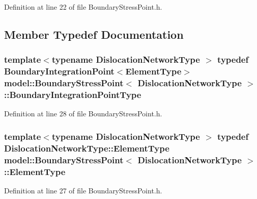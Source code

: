Definition at line 22 of file Boundary\+Stress\+Point.\+h.



\subsection{Member Typedef Documentation}
\hypertarget{structmodel_1_1_boundary_stress_point_a8e4470be4cf3e1bf6b903a300a9d5734}{}
\subsubsection[{Boundary\+Integration\+Point\+Type}]{\setlength{\rightskip}{0pt plus 5cm}template$<$typename Dislocation\+Network\+Type $>$ typedef {\bf Boundary\+Integration\+Point}$<${\bf Element\+Type}$>$ {\bf model\+::\+Boundary\+Stress\+Point}$<$ Dislocation\+Network\+Type $>$\+::{\bf Boundary\+Integration\+Point\+Type}}\label{structmodel_1_1_boundary_stress_point_a8e4470be4cf3e1bf6b903a300a9d5734}


Definition at line 28 of file Boundary\+Stress\+Point.\+h.

\hypertarget{structmodel_1_1_boundary_stress_point_abbe62ae453e93d99f80b043f4de9bf04}{}
\subsubsection[{Element\+Type}]{\setlength{\rightskip}{0pt plus 5cm}template$<$typename Dislocation\+Network\+Type $>$ typedef Dislocation\+Network\+Type\+::\+Element\+Type {\bf model\+::\+Boundary\+Stress\+Point}$<$ Dislocation\+Network\+Type $>$\+::{\bf Element\+Type}}\label{structmodel_1_1_boundary_stress_point_abbe62ae453e93d99f80b043f4de9bf04}


Definition at line 27 of file Boundary\+Stress\+Point.\+h.

\hypertarget{structmodel_1_1_boundary_stress_point_a0a32689c2130c3a3729817e775a96751}{}
